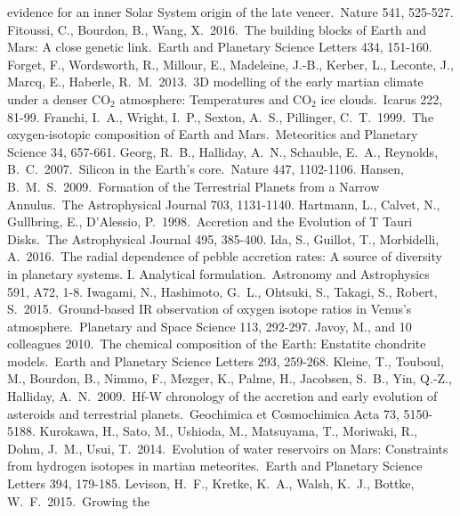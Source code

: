 \documentclass[preprint,5p,times,authoryear]{elsarticle}
\begin{document}
\begin{thebibliography}{}
evidence for an inner Solar System origin of the late veneer.\ Nature 541, 525-527.
 Fitoussi, C., Bourdon, B., Wang, X.\ 2016.\ The building blocks of Earth and Mars: 
A close genetic link.\ Earth and Planetary Science Letters 434, 151-160.
 Forget, F., Wordsworth, R., Millour, E., Madeleine, J.-B., Kerber, L., Leconte, 
J., Marcq, E., Haberle, R.~M.\ 2013.\ 3D modelling of the early martian climate under a denser CO$_{2}$ atmosphere: Temperatures and 
CO$_{2}$ ice clouds.\ Icarus 222, 81-99.
 Franchi, I.~A., Wright, I.~P., Sexton, A.~S., Pillinger, C.~T.\ 1999.\ The 
oxygen-isotopic composition of Earth and Mars.\ Meteoritics and Planetary Science 34, 657-661.
 Georg, R.~B., Halliday, A.~N., Schauble, E.~A., Reynolds, B.~C.\ 2007.\ 
Silicon in the Earth's core.\ Nature 447, 1102-1106. 
 Hansen, B.~M.~S.\ 2009.\ Formation of the Terrestrial Planets from a Narrow Annulus.\ 
The Astrophysical Journal 703, 1131-1140.
\bibitem[Hartmann et al.(1998)]{H98} Hartmann, L., Calvet, N., Gullbring, E., D'Alessio, P.\ 1998.\ Accretion and the 
Evolution of T Tauri Disks.\ The Astrophysical Journal 495, 385-400.
\bibitem[Ida et al.(2016)]{I16} Ida, S., Guillot, T., Morbidelli, A.\ 2016.\ The radial dependence of pebble 
accretion rates: A source of diversity in planetary systems. I. Analytical formulation.\ Astronomy and Astrophysics 591, A72, 1-8.
\bibitem[Iwagami et al.(2015)]{I15} Iwagami, N., Hashimoto, G.~L., Ohtsuki, S., Takagi, S., Robert, S.\ 2015.\ 
Ground-based IR observation of oxygen isotope ratios in Venus's atmosphere.\ Planetary and Space Science 113, 292-297.
\bibitem[Javoy et al.(2010)]{J10} Javoy, M., and 10 colleagues 2010.\ The chemical composition of the Earth: Enstatite 
chondrite models.\ Earth and Planetary Science Letters 293, 259-268.
\bibitem[Kleine et al.(2009)]{K09} Kleine, T., Touboul, M., Bourdon, B., Nimmo, F., Mezger, K., Palme, H., Jacobsen, S.~B., Yin, 
Q.-Z., Halliday, A.~N.\ 2009.\ Hf-W chronology of the accretion and early evolution of asteroids and terrestrial planets.\ Geochimica 
et Cosmochimica Acta 73, 5150-5188.
\bibitem[Kurokawa et al.(2014)]{K14} Kurokawa, H., Sato, M., Ushioda, M., Matsuyama, T., Moriwaki, R., Dohm, J.~M., 
Usui, T.\ 2014.\ Evolution of water reservoirs on Mars: Constraints from hydrogen isotopes in martian meteorites.\ Earth and Planetary 
Science Letters 394, 179-185.
\bibitem[Levison et al.(2015)]{L15} Levison, H.~F., Kretke, K.~A., Walsh, K.~J., Bottke, W.~F.\ 2015.\ Growing the 

\end{thebibliography}
\end{document}
